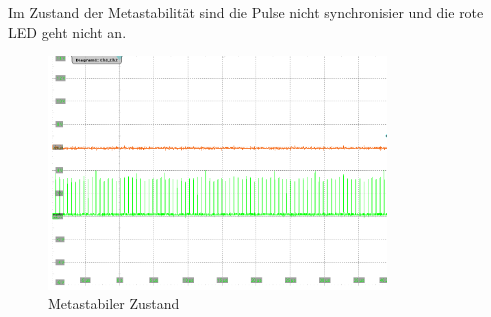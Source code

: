 \newpage
Im Zustand der Metastabilität sind die Pulse nicht synchronisier und die rote LED geht nicht an.\\

\begin{figure}[H]
	\centering
	\includegraphics[width=0.8\textwidth]{images/metastability/asynchron_en_.png}
	\caption{Metastabiler Zustand}
	\label{fig.metastabil.Metastabil}
\end{figure}

